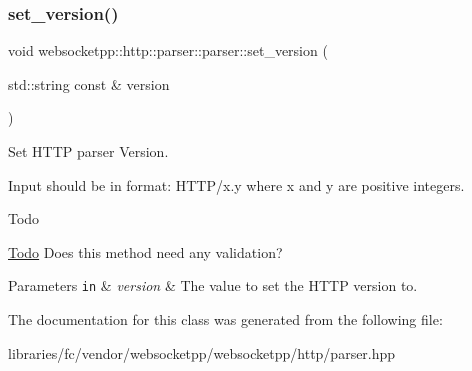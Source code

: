 \subsubsection{\texorpdfstring{set\+\_\+version()}{set\_version()}}
{\footnotesize\ttfamily void websocketpp\+::http\+::parser\+::parser\+::set\+\_\+version (\begin{DoxyParamCaption}\item[{std\+::string const \&}]{version }\end{DoxyParamCaption})\hspace{0.3cm}{\ttfamily [inline]}}



Set H\+T\+TP parser Version. 

Input should be in format\+: H\+T\+T\+P/x.\+y where x and y are positive integers. \begin{DoxyRefDesc}{Todo}
\item[\mbox{\hyperlink{todo__todo000015}{Todo}}]Does this method need any validation?\end{DoxyRefDesc}



\begin{DoxyParams}[1]{Parameters}
\mbox{\tt in}  & {\em version} & The value to set the H\+T\+TP version to. \\
\hline
\end{DoxyParams}


The documentation for this class was generated from the following file\+:\begin{DoxyCompactItemize}
\item 
libraries/fc/vendor/websocketpp/websocketpp/http/parser.\+hpp\end{DoxyCompactItemize}
